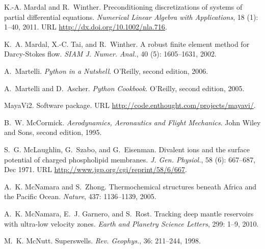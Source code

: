 \begin{thebibliography}{467}
K.-A. Mardal and R.~Winther.
\newblock Preconditioning discretizations of systems of partial differential
  equations.
\newblock \emph{Numerical Linear Algebra with Applications}, 18
  (1): 1--40, 2011.
\newblock URL \url{http://dx.doi.org/10.1002/nla.716}.

K.~A. Mardal, X.-C. Tai, and R.~Winther.
\newblock A robust finite element method for {D}arcy-{S}tokes flow.
\newblock \emph{SIAM J. Numer. Anal.}, 40 (5): 1605--1631,
  2002.

A.~Martelli.
\newblock \emph{Python in a Nutshell}.
\newblock O'Reilly, second edition, 2006.

A.~Martelli and D.~Ascher.
\newblock \emph{Python Cookbook}.
\newblock O'Reilly, second edition, 2005.

{MayaVi2}.
\newblock Software package.
\newblock URL \url{http://code.enthought.com/projects/mayavi/}.

B.~W. McCormick.
\newblock \emph{Aerodynamics, Aeronautics and Flight Mechanics}.
\newblock John Wiley and Sons, second edition, 1995.

S.~G. McLaughlin, G.~Szabo, and G.~Eisenman.
\newblock Divalent ions and the surface potential of charged phospholipid
  membranes.
\newblock \emph{J. Gen. Physiol.}, 58 (6): 667--687, Dec
  1971.
\newblock URL \url{http://www.jgp.org/cgi/reprint/58/6/667}.

A.~K. McNamara and S.~Zhong.
\newblock Thermochemical structures beneath {A}frica and the {P}acific {O}cean.
\newblock \emph{Nature}, 437: 1136--1139, 2005.

A.~K. McNamara, E.~J. Garnero, and S.~Rost.
\newblock Tracking deep mantle reservoirs with ultra-low velocity zones.
\newblock \emph{Earth and Planetry Science Letters}, 299: 1--9, 2010.

M.~K. McNutt.
\newblock Superswells.
\newblock \emph{Rev. Geophys.}, 36: 211--244, 1998.


\end{thebibliography}
